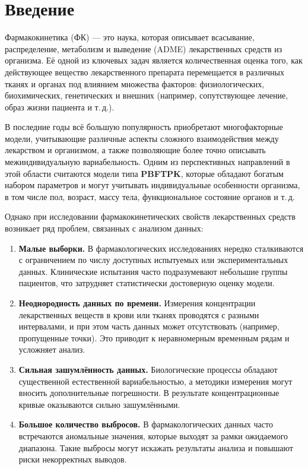 \documentclass[oneside,senior,etd]{BYUPhys}
\begin{document}
\fixmargins
\makepreliminarypages

\oneandhalfspace

\tableofcontents

\section{Введение}

Фармакокинетика (ФК) — это наука, которая описывает всасывание, распределение, метаболизм и выведение (ADME) лекарственных средств из организма. Её одной из ключевых задач является количественная оценка того, как действующее вещество лекарственного препарата перемещается в различных тканях и органах под влиянием множества факторов: физиологических, биохимических, генетических и внешних (например, сопутствующее лечение, образ жизни пациента и т.\,д.).

В последние годы всё большую популярность приобретают многофакторные модели, учитывающие различные аспекты сложного взаимодействия между лекарством и организмом, а также позволяющие более точно описывать межиндивидуальную вариабельность. Одним из перспективных направлений в этой области считаются модели типа \textbf{PBFTPK}\cite{macheras}, которые обладают богатым набором параметров и могут учитывать индивидуальные особенности организма, в том числе пол, возраст, массу тела, функциональное состояние органов и т.\,д.

Однако при исследовании фармакокинетических свойств лекарственных средств возникает ряд проблем, связанных с анализом данных:

\begin{enumerate}
	\item \textbf{Малые выборки.} В фармакологических исследованиях нередко сталкиваются с ограничением по числу доступных испытуемых или экспериментальных данных. Клинические испытания часто подразумевают небольшие группы пациентов, что затрудняет статистически достоверную оценку модели.

	\item \textbf{Неоднородность данных по времени.} Измерения концентрации лекарственных веществ в крови или тканях проводятся с разными интервалами, и при этом часть данных может отсутствовать (например, пропущенные точки). Это приводит к неравномерным временным рядам и усложняет анализ.

	\item \textbf{Сильная зашумлённость данных.} Биологические процессы обладают существенной естественной вариабельностью, а методики измерения могут вносить дополнительные погрешности. В результате концентрационные кривые оказываются сильно зашумлёнными.

	\item \textbf{Большое количество выбросов.} В фармакологических данных часто встречаются аномальные значения, которые выходят за рамки ожидаемого диапазона. Такие выбросы могут искажать результаты анализа и повышают риски некорректных выводов.

\end{enumerate}
\end{document}
